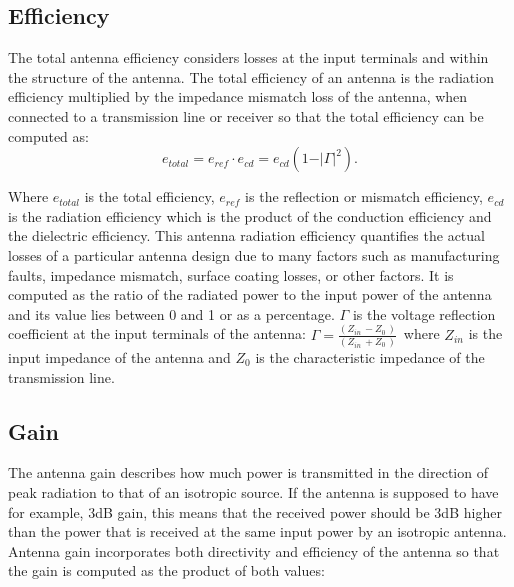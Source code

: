 


\subsection{Efficiency}

The total antenna efficiency considers losses at the input terminals and within the structure of the antenna. The total efficiency of an antenna is the radiation efficiency multiplied by the impedance mismatch loss of the antenna, when connected to a transmission line or receiver so that the total efficiency can be computed as:
\begin{equation}
e_{total}= e_{ref} \cdot e_{cd}= e_{cd} \left( 1- \vert  \Gamma  \vert ^{2} \right).
\end{equation}

Where $e_{total}$ is the total efficiency, $e_{ref}$ is the reflection or mismatch efficiency, $e_{cd}$ is the radiation efficiency which is the product of the conduction efficiency and the dielectric efficiency. This antenna radiation efficiency quantifies the actual losses of a particular antenna design due to many factors such as manufacturing faults, impedance mismatch, surface coating losses, or other factors. It is computed as the ratio of the radiated power to the input power of the antenna and its value lies between 0 and 1 or as a percentage. $\Gamma$ is the voltage reflection coefficient at the input terminals of the antenna:  $\Gamma =\frac{ \left( Z_{in~}- Z_{0~} \right) }{ \left( Z_{in~}+ Z_{0~} \right) }$\  where  $Z_{in}$ is the input impedance of the antenna and  $Z_{0}$ is the characteristic impedance of the transmission line.

\subsection{Gain}
The antenna gain describes how much power is transmitted in the direction of peak radiation to that of an isotropic source. If the antenna is supposed to have for example, 3dB gain, this means that the received power should be 3dB higher than the power that is received at the same input power by an isotropic antenna. Antenna gain incorporates both directivity and efficiency of the antenna so that the gain is computed as the product of both values: 

